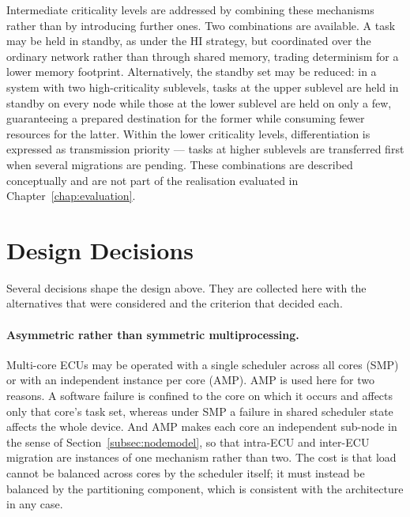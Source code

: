 \medskip
\noindent
Intermediate criticality levels are addressed by combining these mechanisms
rather than by introducing further ones. Two combinations are available. A task
may be held in standby, as under the \textsf{HI} strategy, but coordinated over
the ordinary network rather than through shared memory, trading determinism for
a lower memory footprint. Alternatively, the standby set may be reduced: in a
system with two high-criticality sublevels, tasks at the upper sublevel are held
in standby on every node while those at the lower sublevel are held on only a
few, guaranteeing a prepared destination for the former while consuming fewer
resources for the latter. Within the lower criticality levels, differentiation
is expressed as transmission priority --- tasks at higher sublevels are
transferred first when several migrations are pending. These combinations are
described conceptually and are not part of the realisation evaluated in
Chapter~\ref{chap:evaluation}.

\section{Design Decisions}\label{sec:designdecisions}

Several decisions shape the design above. They are collected here with the
alternatives that were considered and the criterion that decided each.

\paragraph{Asymmetric rather than symmetric multiprocessing.}
Multi-core ECUs may be operated with a single scheduler across all cores (SMP)
or with an independent instance per core (AMP). AMP is used here for two
reasons. A software failure is confined to the core on which it occurs and
affects only that core's task set, whereas under SMP a failure in shared
scheduler state affects the whole device. And AMP makes each core an
independent sub-node in the sense of Section~\ref{subsec:nodemodel}, so that
intra-ECU and inter-ECU migration are instances of one mechanism rather than
two. The cost is that load cannot be balanced across cores by the scheduler
itself; it must instead be balanced by the partitioning component, which is
consistent with the architecture in any case.

